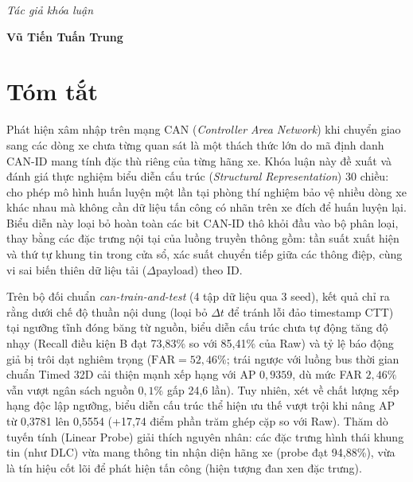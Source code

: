 \documentclass[12pt, a4paper, reqno, oneside]{book}
\newcommand\chap[1]{%
  \clearpage\phantomsection%
  \chapter*{#1}%
  \addcontentsline{toc}{chapter}{#1}%
  \markboth{#1}{}%
}
\begin{document}
\begin{flushright}
{\it Tác giả khóa luận}
\hskip 1.5cm\quad

\vskip 2cm
{\bf Vũ Tiến Tuấn Trung}  \quad\ \quad
\end{flushright}

\newpage

\chap{Tóm tắt}

Phát hiện xâm nhập trên mạng CAN (\textit{Controller Area Network}) khi chuyển giao sang các dòng xe chưa từng quan sát là một thách thức lớn do mã định danh CAN-ID mang tính đặc thù riêng của từng hãng xe. Khóa luận này đề xuất và đánh giá thực nghiệm biểu diễn cấu trúc (\textit{Structural Representation}) 30 chiều: cho phép mô hình huấn luyện một lần tại phòng thí nghiệm bảo vệ nhiều dòng xe khác nhau mà không cần dữ liệu tấn công có nhãn trên xe đích để huấn luyện lại. Biểu diễn này loại bỏ hoàn toàn các bit CAN-ID thô khỏi đầu vào bộ phân loại, thay bằng các đặc trưng nội tại của luồng truyền thông gồm: tần suất xuất hiện và thứ tự khung tin trong cửa sổ, xác suất chuyển tiếp giữa các thông điệp, cùng vi sai biến thiên dữ liệu tải ($\Delta\text{payload}$) theo ID.

Trên bộ đối chuẩn \textit{can-train-and-test} (4 tập dữ liệu qua 3 seed), kết quả chỉ ra rằng dưới chế độ thuần nội dung (loại bỏ $\Delta t$ để tránh lỗi đảo timestamp CTT) tại ngưỡng tĩnh đóng băng từ nguồn, biểu diễn cấu trúc chưa tự động tăng độ nhạy (Recall điều kiện B đạt 73,83\% so với 85,41\% của Raw) và tỷ lệ báo động giả bị trôi dạt nghiêm trọng ($\text{FAR} = 52{,}46\%$; trái ngược với luồng bus thời gian chuẩn Timed 32D cải thiện mạnh xếp hạng với AP $0{,}9359$, dù mức FAR $2{,}46\%$ vẫn vượt ngân sách nguồn $0{,}1\%$ gấp 24,6 lần). Tuy nhiên, xét về chất lượng xếp hạng độc lập ngưỡng, biểu diễn cấu trúc thể hiện ưu thế vượt trội khi nâng AP từ 0,3781 lên 0,5554 (+17,74 điểm phần trăm ghép cặp so với Raw). Thăm dò tuyến tính (Linear Probe) giải thích nguyên nhân: các đặc trưng hình thái khung tin (như DLC) vừa mang thông tin nhận diện hãng xe (probe đạt 94,88\%), vừa là tín hiệu cốt lõi để phát hiện tấn công (hiện tượng đan xen đặc trưng).
\end{document}
